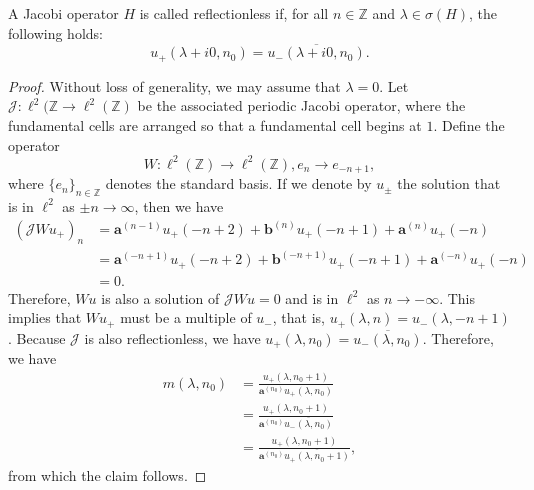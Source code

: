 \documentclass[10pt,a4paper]{amsart}
\newcommand{\bseq}[2]{{\bm{#1}^{(#2)}}}
\begin{document}
\begin{definition}
    A Jacobi operator $H$ is called reflectionless if, for all $n\in \mathbb{Z}$ and $\lambda \in \sigma(H)$, the following holds:
    \begin{equation}
        u_+(\lambda + i0,n_0) = \overline{u_-(\lambda + i0,n_0)}.
    \end{equation}
\end{definition}

\begin{proof}
    Without loss of generality, we may assume that $\lambda = 0$. Let $\mathcal{J}: \ell^2(\mathbb{Z}\rightarrow \ell^2(\mathbb{Z})$ be the associated periodic Jacobi operator, where the fundamental cells are arranged so that a fundamental cell begins at $1$. Define the operator $$W:\ell^2(\mathbb{Z})\rightarrow\ell^2(\mathbb{Z}), e_{n}\rightarrow e_{-n+1},$$ where $\{e_n\}_{n\in \mathbb{Z}}$ denotes the standard basis.  If we denote by $u_\pm$ the solution that is in $\ell^2$ as $\pm n\rightarrow \infty$, then we have
    \begin{equation}
        \begin{aligned}
            (\mathcal{J}Wu_+)_n&=\bseq{a}{n-1}u_+(-n+2) + \bseq{b}{n}u_+(-n+1) + \bseq{a}{n}u_+(-n)\\
            &=\bseq{a}{-n+1}u_+(-n+2) + \bseq{b}{-n+1}u_+(-n+1) + \bseq{a}{-n}u_+(-n)\\
            &=0.
        \end{aligned}
    \end{equation}
    Therefore, $Wu$ is also a solution of $\mathcal{J}Wu=0$ and is in $\ell^2$ as $n\rightarrow-\infty$. This implies that $Wu_+$ must be a multiple of $u_-$, that is, $u_+(\lambda,n) = u_-(\lambda,-n+1)$. Because $\mathcal{J}$ is also reflectionless, we have $u_+(\lambda,n_0) = \overline{u_-(\lambda, n_0)}$. Therefore, we have
    \begin{equation}
        \begin{aligned}
            m(\lambda,n_0) &= \frac{u_+(\lambda, n_0+1)}{\bseq{a}{n_0}u_+(\lambda, n_0)}\\
            &=\frac{u_+(\lambda, n_0+1)}{\bseq{a}{n_0}\overline{u_-(\lambda, n_0)}}\\
            &=\frac{u_+(\lambda,n_0+1)}{\bseq{a}{n_0}\overline{u_+(\lambda,n_0+1)}},
        \end{aligned}
    \end{equation}
    from which the claim follows.
\end{proof}
\end{document}
